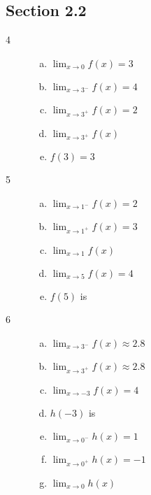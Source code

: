 \documentclass[letterpaper, landscape]{exam}
\begin{document}
    \subsection{Section 2.2}
    \begin{description}

      \item[4]
        \begin{enumerate}[(a)]
          \item $\lim_{x \to 0} f(x) = \boxed{ 3 }$
          \item $\lim_{x \to 3^-} f(x) = \boxed{ 4 }$
          \item $\lim_{x \to 3^+} f(x) = \boxed{ 2 }$
          \item $\lim_{x \to 3^+} f(x)$  
          \item $f(3) = \boxed{ 3 }$
        \end{enumerate}

      \newpage 

      \item[5]
        \begin{enumerate}[(a)]
          \item $\lim_{x \to 1^-} f(x) = \boxed{ 2 }$
          \item $\lim_{x \to 1^+} f(x) = \boxed{ 3 }$
          \item $\lim_{x \to 1} f(x)$ 
          \item $\lim_{x \to 5} f(x) = \boxed{ 4 }$
          \item $f(5)$ is 
        \end{enumerate}

      \item[6]
        \begin{enumerate}[(a)]
          \item $\lim_{x \to 3^-} f(x) \approx \boxed{ 2.8 }$
          \item $\lim_{x \to 3^+} f(x) \approx \boxed{ 2.8 }$
          \item $\lim_{x \to -3} f(x) = 4$

          \item $h(-3)$ is 

          \item $\lim_{x \to 0^-} h(x) = \boxed{ 1 }$

          \item $\lim_{x \to 0^+} h(x) = \boxed{ -1 }$

          \item $\lim_{x \to 0} h(x)$ 


\end{enumerate}
\end{description}
\end{document}
